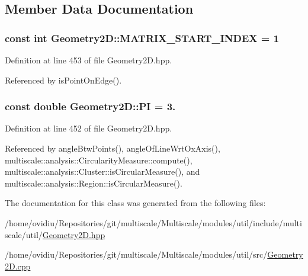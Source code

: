 \subsection{Member Data Documentation}
\hypertarget{classmultiscale_1_1Geometry2D_ade1d55d3ef110b73d42a3e4c4360ba17}{
\subsubsection[{M\-A\-T\-R\-I\-X\-\_\-\-S\-T\-A\-R\-T\-\_\-\-I\-N\-D\-E\-X}]{\setlength{\rightskip}{0pt plus 5cm}const int Geometry2\-D\-::\-M\-A\-T\-R\-I\-X\-\_\-\-S\-T\-A\-R\-T\-\_\-\-I\-N\-D\-E\-X = 1\hspace{0.3cm}{\ttfamily [static]}}}\label{classmultiscale_1_1Geometry2D_ade1d55d3ef110b73d42a3e4c4360ba17}


Definition at line 453 of file Geometry2\-D.\-hpp.



Referenced by is\-Point\-On\-Edge().

\hypertarget{classmultiscale_1_1Geometry2D_a7039b8bbe89283e22744c0631d597660}{
\subsubsection[{P\-I}]{\setlength{\rightskip}{0pt plus 5cm}const double Geometry2\-D\-::\-P\-I = 3.\hspace{0.3cm}{\ttfamily [static]}}}\label{classmultiscale_1_1Geometry2D_a7039b8bbe89283e22744c0631d597660}


Definition at line 452 of file Geometry2\-D.\-hpp.



Referenced by angle\-Btw\-Points(), angle\-Of\-Line\-Wrt\-Ox\-Axis(), multiscale\-::analysis\-::\-Circularity\-Measure\-::compute(), multiscale\-::analysis\-::\-Cluster\-::is\-Circular\-Measure(), and multiscale\-::analysis\-::\-Region\-::is\-Circular\-Measure().



The documentation for this class was generated from the following files\-:\begin{DoxyCompactItemize}
\item 
/home/ovidiu/\-Repositories/git/multiscale/\-Multiscale/modules/util/include/multiscale/util/\hyperlink{Geometry2D_8hpp}{Geometry2\-D.\-hpp}\item 
/home/ovidiu/\-Repositories/git/multiscale/\-Multiscale/modules/util/src/\hyperlink{Geometry2D_8cpp}{Geometry2\-D.\-cpp}\end{DoxyCompactItemize}
